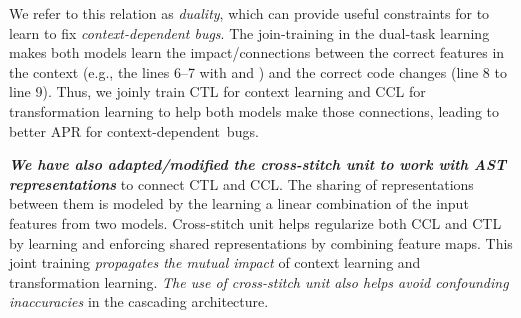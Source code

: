 We refer to this relation as {\em duality}, which can provide useful
constraints for {\tool} to learn to fix {\em context-dependent
  bugs}.
The join-training in the dual-task learning makes both models learn
the impact/connections between the correct features in the context
(e.g., the lines 6--7 with  and )
and the correct code changes (line 8 to line 9). Thus, we
joinly train CTL for context learning and CCL for transformation
learning to help both models make those connections, leading to better
APR for context-dependent~bugs.


{\bf {\em We have also adapted/modified the cross-stitch
    unit \cite{misra2016cross} to work with AST representations}} to
connect CTL and CCL. The sharing of representations between them is
modeled by the learning a linear combination of the input features
from two models. Cross-stitch unit helps regularize both CCL and CTL
by learning and enforcing shared representations by combining feature
maps. This joint training {\em propagates the mutual impact} of
context learning and transformation learning. {\em The use of
  cross-stitch unit also helps avoid confounding inaccuracies} in the
cascading architecture.

